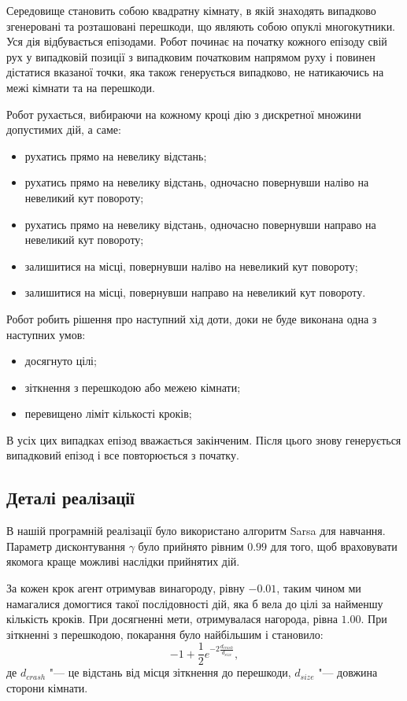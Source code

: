 \documentclass[a4paper,10pt,fleqn]{article}
\begin{document}
Середовище становить собою квадратну кімнату, в якій знаходять випадково згенеровані та розташовані перешкоди, що являють собою опуклі многокутники. Уся дія відбувається епізодами. Робот починає на початку кожного епізоду свій рух у випадковій позиції з випадковим початковим напрямом руху і повинен дістатися вказаної точки, яка також генерується випадково, не натикаючись на межі кімнати та на перешкоди.

Робот рухається, вибираючи на кожному кроці дію з дискретної множини допустимих дій, а саме:
\begin{itemize}
	\item рухатись прямо на невелику відстань;
	\item рухатись прямо на невелику відстань, одночасно повернувши наліво на невеликий кут повороту;
	\item рухатись прямо на невелику відстань, одночасно повернувши направо на невеликий кут повороту;
	\item залишитися на місці, повернувши наліво на невеликий кут повороту;
	\item залишитися на місці, повернувши направо на невеликий кут повороту.
\end{itemize}

Робот робить рішення про наступний хід доти, доки не буде виконана одна з наступних умов:
\begin{itemize}
	\item досягнуто цілі;
    \item зіткнення з перешкодою або межею кімнати;
	\item перевищено ліміт кількості кроків;
\end{itemize}

В усіх цих випадках епізод вважається закінченим. Після цього знову генерується випадковий епізод і все повторюється з початку.

\subsection{Деталі реалізації}

В нашій програмній реалізації було використано алгоритм Sarsa для навчання. Параметр дисконтування $\gamma$ було прийнято рівним $0.99$ для того, щоб враховувати якомога краще можливі наслідки прийнятих дій.

За кожен крок агент отримував винагороду, рівну $-0.01$, таким чином ми намагалися домогтися такої послідовності дій, яка б вела до цілі за найменшу кількість кроків. При досягненні мети, отримувалася нагорода, рівна $1.00$. При зіткненні з перешкодою, покарання було найбільшим і становило:
\[
    -1+ \frac{1}{2} e^{-2\frac{d_{crash}}{d_{size}}},
\]
де $d_{crash}$ "--- це відстань від місця зіткнення до перешкоди, $d_{size}$ "--- довжина сторони кімнати.
\end{document}
